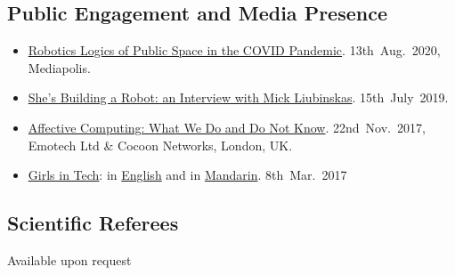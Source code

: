 \documentclass[11pt,letterpaper]{article}
\begin{document}
\subsection*{Public Engagement and Media Presence}
\begin{itemize}
  \item \href{https://www.mediapolisjournal.com/2020/08/robotic-logics-of-public-space/}{Robotics Logics of Public Space in the COVID Pandemic}. 13th~Aug.~2020, Mediapolis.
  \item \href{https://medium.com/shes-building-a-robot/leimin-tian-9843a1080cd8}{She's Building a Robot: an Interview with Mick Liubinskas}. 15th~July~2019.
  \item \href{https://www.eventbrite.co.uk/e/meet-ai-series-6-tickets-39512362540#}{Affective Computing: What We Do and Do Not Know}. 22nd~Nov.~2017, Emotech Ltd \& Cocoon Networks, London, UK.
  \item \href{https://youtu.be/6Cd_BquE95Q}{Girls in Tech}: in \href{https://youtu.be/dMMtaeqWGlg}{English} and in \href{https://youtu.be/G0cfdK36wTE}{Mandarin}. 8th~Mar.~2017
\end{itemize}

\subsection*{Scientific Referees}
Available upon request
\end{document}
